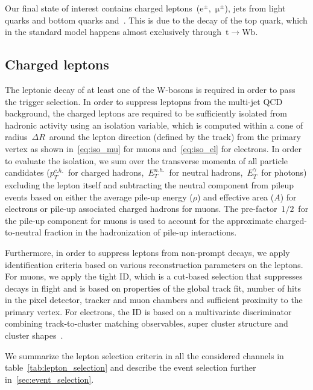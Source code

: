 Our final state of interest contains charged leptons~($\mathrm{e}^\pm$,~$\mathrm{\mu}^\pm$), jets from light quarks and bottom quarks and~\MET. This is due to the decay of the top quark, which in the standard model happens almost exclusively through~$\mathrm{t} \rightarrow \mathrm{W} \mathrm{b}$.

\subsection{Charged leptons}
\label{sec:object_id_lep}

The leptonic decay of at least one of the W-bosons is required in order to pass the trigger selection. In order to suppress leptopns from the multi-jet QCD background, the charged leptons are required to be sufficiently isolated from hadronic activity using an isolation variable, which is computed within a cone of radius~$\Delta R$~around the lepton direction (defined by the track) from the primary vertex as shown in~\cref{eq:iso_mu} for muons and~\cref{eq:iso_el} for electrons. In order to evaluate the isolation, we sum over the transverse momenta of all particle candidates ($p_T^{c.h.}$~for charged hadrons,~$E_T^{n.h.}$~for neutral hadrons,~$E_T^{\gamma}$~for photons) excluding the lepton itself and subtracting the neutral component from pileup events based on either the average pile-up energy ($\rho$) and effective area ($A$) for electrons or pile-up associated charged hadrons for muons. The pre-factor~$1/2$~for the pile-up component for muons is used to account for the approximate charged-to-neutral fraction in the hadronization of pile-up interactions\cite{CMS:2012}.

Furthermore, in order to suppress leptons from non-prompt decays, we apply identification criteria based on various reconstruction parameters on the leptons. For muons, we apply the tight ID, which is a cut-based selection that suppresses decays in flight and is based on properties of the global track fit, number of hits in the pixel detector, tracker and muon chambers and sufficient proximity to the primary vertex\cite{Chatrchyan:2012xi,CMS:2017_muon_pog}. For electrons, the ID is based on a multivariate discriminator combining track-to-cluster matching observables, super cluster structure and cluster shapes~\cite{Khachatryan:2015hwa,CMS:2017_egamma_pog}.

We summarize the lepton selection criteria in all the considered channels in table~\cref{tab:lepton_selection} and describe the event selection further in~\cref{sec:event_selection}.

